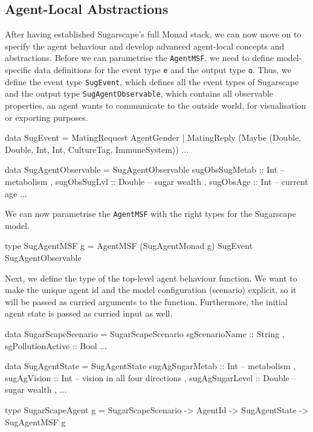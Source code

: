 \subsection{Agent-Local Abstractions}
After having established Sugarscape's full Monad stack, we can now move on to specify the agent behaviour and develop advanced agent-local concepts and abstractions. Before we can parametrise the \texttt{AgentMSF}, we need to define model-specific data definitions for the event type \texttt{e} and the output type \texttt{o}. Thus, we define the event type \texttt{SugEvent}, which defines all the event types of Sugarscape and the output type \texttt{SugAgentObservable}, which contains all observable properties, an agent wants to communicate to the outside world, for visualisation or exporting purposes. 

\begin{HaskellCode}
data SugEvent = MatingRequest AgentGender
              | MatingReply 
                 (Maybe (Double, Double, Int, Int, CultureTag, ImmuneSystem))
              ...

data SugAgentObservable = SugAgentObservable
  { sugObsSugMetab :: Int     -- metabolism
  , sugObsSugLvl   :: Double  -- sugar wealth
  , sugObsAge      :: Int     -- current age
  ...  
  }
\end{HaskellCode}

We can now parametrise the \texttt{AgentMSF} with the right types for the Sugarscape model.

\begin{HaskellCode}
type SugAgentMSF g = AgentMSF (SugAgentMonad g) SugEvent SugAgentObservable
\end{HaskellCode}

Next, we define the type of the top-level agent behaviour function. We want to make the unique agent id and the model configuration (scenario) explicit, so it will be passed as curried arguments to the function. Furthermore, the initial agent state is passed as curried input as well.

\begin{HaskellCode}
data SugarScapeScenario = SugarScapeScenario 
  { sgScenarioName    :: String
  , sgPollutionActive :: Bool
  ...
  }

data SugAgentState = SugAgentState
  { sugAgSugarMetab :: Int     -- metabolism
  , sugAgVision     :: Int     -- vision in all four directions
  , sugAgSugarLevel :: Double  -- sugar wealth
  , ...
  }
  
type SugarScapeAgent g 
       = SugarScapeScenario -> AgentId -> SugAgentState -> SugAgentMSF g
\end{HaskellCode}

